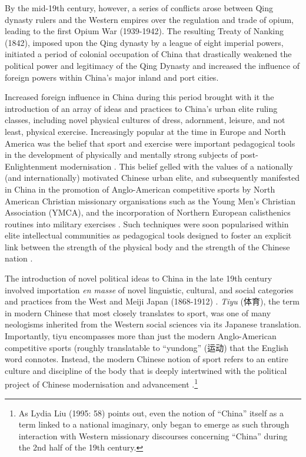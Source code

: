 \begin{CJK}{UTF8}{gbsn}
By the mid-19th century, however, a series of conflicts arose between Qing dynasty rulers and the Western empires over the regulation and trade of opium, leading to the first Opium War (1939-1942).  The resulting Treaty of Nanking (1842), imposed upon the Qing dynasty by a league of eight imperial powers, initiated a period of colonial occupation of China that drastically weakened the political power and legitimacy of the Qing Dynasty and increased the influence of foreign powers within China's major inland and port cities.

Increased foreign influence in China during this period brought with it the introduction of an array of ideas and practices to China's urban elite ruling classes, including novel physical cultures of dress, adornment, leisure, and not least, physical exercise.  Increasingly popular at the time in Europe and North America was the belief that sport and exercise were important pedagogical tools in the development of physically and mentally strong subjects of post-Enlightenment modernisation \citep{Elias1986}.  This belief gelled with the values of a nationally (and internationally) motivated Chinese urban elite, and subsequently manifested in China in the promotion of Anglo-American competitive sports by North American Christian missionary organisations such as the Young Men’s Christian Association (YMCA), and the incorporation of Northern European calisthenics routines into military exercises \citep[240]{Morris2004}.  Such techniques were soon popularised within elite intellectual communities as pedagogical tools designed to foster an explicit link between the strength of the physical body and the strength of the Chinese nation \cites[32]{Morris2004}[49]{Brownell1995}.

The introduction of novel political ideas to China in the late 19th century involved importation \textit{en masse} of novel linguistic, cultural, and social categories and practices from the West and Meiji Japan (1868-1912) \citep{Liu1995}. \textit{Tiyu} (体育), the term in modern Chinese that most closely translates to sport, was one of many neologisms inherited from the Western social sciences via its Japanese translation.  Importantly, tiyu encompasses more than just the modern Anglo-American competitive sports (roughly translatable to ``yundong'' (运动) that the English word connotes.  Instead, the modern Chinese notion of sport refers to an entire culture and discipline of the body that is deeply intertwined with the political project of Chinese modernisation and advancement \citep{Morris2004}.\footnote{As Lydia Liu (1995: 58) points out, even the notion of ``China'' itself as a term linked to a national imaginary, only began to emerge as such through interaction with Western missionary discourses concerning ``China'' during the 2nd half of the 19th century.}


\end{CJK}
